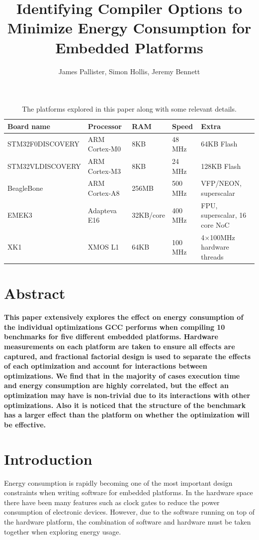 \documentclass[twocolumn]{article}
\title{\bfseries\fontsize{22}{1}\selectfont Identifying Compiler Options to Minimize Energy Consumption for Embedded Platforms}
\author{James Pallister, Simon Hollis, Jeremy Bennett}
\newcommand{\nsection}[1]{\section{\bfseries #1}}
\let\oldcaption\caption
\renewcommand{\caption}[1]{\oldcaption{\textup{#1}}}
\begin{document}
\maketitle
\begin{table}[!hbt]
	\centering
	\begin{tabular}{l l l l l}
		\textbf{Board name} & \textbf{Processor} & \textbf{RAM} & \textbf{Speed} & \textbf{Extra} \\
		\hline
		STM32F0DISCOVERY	& ARM Cortex-M0 		& 8KB		& 48 MHz		  & 64KB Flash\\
		STM32VLDISCOVERY	& ARM Cortex-M3 		& 8KB		& 24 MHz		  & 128KB Flash\\
		BeagleBone			& ARM Cortex-A8 		& 256MB		& 500 MHz		  & VFP/NEON, superscalar\\
		EMEK3				& Adapteva E16 			& 32KB/core & 400 MHz		  & FPU, superscalar, 16 core NoC\\
		XK1					& XMOS L1 				& 64KB		& 100 MHz 		& 4$\times$100MHz hardware threads \\
	\end{tabular}
	\caption{The platforms explored in this paper along with some relevant details.}
	\label{Table:Platforms}
\end{table}

\nsection{Abstract}

{\bfseries
This paper extensively explores the effect on energy consumption of the individual optimizations GCC performs when compiling 10 benchmarks for five different embedded platforms. Hardware measurements on each platform are taken to ensure all effects are captured, and fractional factorial design is used to separate the effects of each optimization and account for interactions between optimizations. We find that in the majority of cases execution time and energy consumption are highly correlated, but the effect an optimization may have is non-trivial due to its interactions with other optimizations. Also it is noticed that the structure of the benchmark has a larger effect than the platform on whether the optimization will be effective.
}

\nsection{Introduction}


Energy consumption is rapidly becoming one of the most important design constraints when writing software for embedded platforms. In the hardware space there have been many features such as clock gates to reduce the power consumption of electronic devices. However, due to the software running on top of the hardware platform, the combination of software and hardware must be taken together when exploring energy usage.
\end{document}
